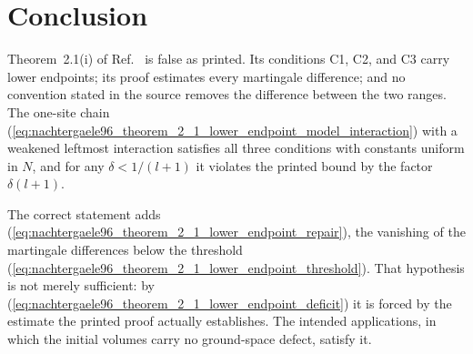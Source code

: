\documentclass{article}
\begin{document}
\section{Conclusion}

Theorem~2.1(i) of Ref.~\cite{Nachtergaele1996Spectral} is false as printed.
Its conditions C1, C2, and C3 carry lower endpoints; its proof estimates every
martingale difference; and no convention stated in the source removes the
difference between the two ranges. The one-site chain
(\ref{eq:nachtergaele96_theorem_2_1_lower_endpoint_model_interaction}) with a
weakened leftmost interaction satisfies all three conditions with constants
uniform in $N$, and for any $\delta<1/(l+1)$ it violates the printed bound by
the factor $\delta(l+1)$.

The correct statement adds
(\ref{eq:nachtergaele96_theorem_2_1_lower_endpoint_repair}), the vanishing of
the martingale differences below the threshold
(\ref{eq:nachtergaele96_theorem_2_1_lower_endpoint_threshold}). That
hypothesis is not merely sufficient: by
(\ref{eq:nachtergaele96_theorem_2_1_lower_endpoint_deficit}) it is forced by
the estimate the printed proof actually establishes. The intended
applications, in which the initial volumes carry no ground-space defect,
satisfy it.



\end{document}
